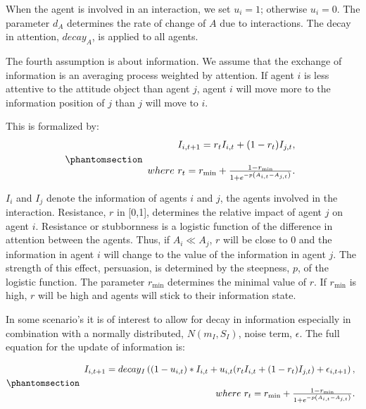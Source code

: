 \documentclass[
  a4paper,
  DIV=11,
  numbers=noendperiod,
  oneside]{scrreprt}
\begin{document}
When the agent is involved in an interaction, we set \(u_{i} = 1\);
otherwise \(u_{i} = 0\). The parameter \(d_{A}\) determines the rate of
change of \(A\) due to interactions. The decay in attention,
\({decay}_A\), is applied to all agents.

The fourth assumption is about information. We assume that the exchange
of information is an averaging process weighted by attention. If agent
\(i\) is less attentive to the attitude object than agent \(j\), agent
\(i\) will move more to the information position of \(j\) than \(j\)
will move to \(i\).

This is formalized by:
\begin{equation}\phantomsection\label{eq-ch7-6-old-55}{\begin{array}{r}
I_{i,t+1}=r_{t}I_{i,t}+(1-r_{t}) I_{j,t},\\ 
\\[0.2em]
where\ r_{t} = r_{\min} + \frac{1 - r_{\min}}{1 + e^{- p\left( A_{i,t} - A_{j,t} \right)}}. \\
\end{array}}\end{equation}

\(I_{i}\) and \(I_{j}\) denote the information of agents \(i\) and
\(j\), the agents involved in the interaction. Resistance, \(r\) in
{[}0,1{]}, determines the relative impact of agent \(j\) on agent \(i\).
Resistance or stubbornness is a logistic function of the difference in
attention between the agents. Thus, if \(A_{i} \ll A_{j}\), \(r\) will
be close to 0 and the information in agent \(i\) will change to the
value of the information in agent \(j\). The strength of this effect,
persuasion, is determined by the steepness, \(p\), of the logistic
function. The parameter \(r_{\min}\) determines the minimal value of
\(r\). If \(r_{\min}\) is high, \(r\) will be high and agents will stick
to their information state.

In some scenario's it is of interest to allow for decay in information
especially in combination with a normally distributed,
\(N(m_{I},S_{I})\), noise term, \(\epsilon\). The full equation for the
update of information is:

\begin{equation}\phantomsection\label{eq-ch7-6-old-55b}{\begin{array}{r}
I_{i,t+1}=decay{_I} \left((1-u_{i,t} )*I_{i,t}+u_{i,t} (r_{t}I_{i,t}+(1-r_{t}) I_{j,t})+\epsilon_{i,t+1}\right),\\
\\[0.2em]
where\ r_{t} = r_{\min} + \frac{1 - r_{\min}}{1 + e^{- p\left( A_{i,t} - A_{j,t} \right)}}. \\
\end{array}}\end{equation}
\end{document}
